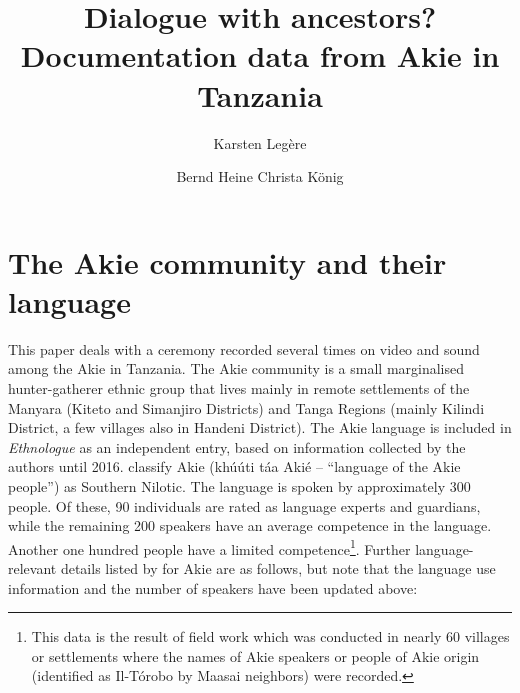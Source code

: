 \documentclass[output=paper,colorlinks,citecolor=brown]{langscibook}
\author{Karsten Legère\affiliation{University of Gothenburg}\and Bernd Heine \affiliation{University of Cologne}\lastand  Christa König\affiliation{Goethe University Frankfurt}}
\title{Dialogue with ancestors? Documentation data from Akie in Tanzania}
\begin{document}
\maketitle

\section{The Akie community and their language}\label{sec:legere:1}

This paper deals with a ceremony recorded several times on video and sound among the Akie in Tanzania. The Akie community is a small marginalised hunter-gatherer ethnic group that lives mainly in remote settlements of the Manyara (Kiteto and Simanjiro Districts) and Tanga Regions (mainly Kilindi District, a few villages also in Handeni District). The Akie language is included in \textit{Ethnologue} \citep{SimonsFennig2018}  as an independent entry, based on information collected by the authors until 2016. \citeauthor{SimonsFennig2018} classify Akie (khúúti táa Akié – “language of the Akie people”) as Southern Nilotic. The language is spoken by approximately 300 people. Of these, 90 individuals are rated as language experts and guardians, while the remaining 200 speakers have an average competence in the language. Another one hundred people have a limited competence\footnote{This data is the result of field work which was conducted  in nearly 60 villages or settlements where the names of Akie speakers or people of Akie origin (identified as Il-Tórobo by Maasai neighbors) were recorded.}. Further language-relevant details listed by \citeauthor{SimonsFennig2018} for Akie are as follows, but note that the language use information and the number of speakers have been updated above:
\end{document}
